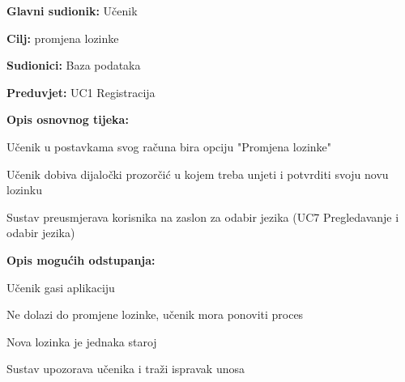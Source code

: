 \noindent {}
\begin{packed_item}

	\item \textbf{Glavni sudionik:} Učenik
	\item  \textbf{Cilj:} promjena lozinke
	\item  \textbf{Sudionici:} Baza podataka
	\item  \textbf{Preduvjet:} UC1 Registracija 
	\item  \textbf{Opis osnovnog tijeka:}
	
	\item[] \begin{packed_enum}

		\item Učenik u postavkama svog računa bira opciju "Promjena lozinke"
		\item Učenik dobiva dijaločki prozorčić u kojem treba unjeti i potvrditi svoju novu lozinku
		\item Sustav preusmjerava korisnika na zaslon za odabir jezika (UC7 Pregledavanje i odabir jezika)
	\end{packed_enum}
	
	\item  \textbf{Opis mogućih odstupanja:}
	
	\item[] \begin{packed_item}

		\item[1.a]Učenik gasi aplikaciju
		\item[] \begin{packed_enum}
			
			\item Ne dolazi do promjene lozinke, učenik mora ponoviti proces					
		\end{packed_enum}

		\item[2.a] Nova lozinka je jednaka staroj
		\item[] \begin{packed_enum}
			
			\item Sustav upozorava učenika i traži ispravak unosa  								
		\end{packed_enum}
		
	\end{packed_item}
\end{packed_item}


